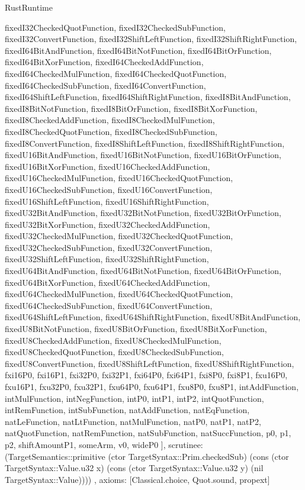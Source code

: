 \begin{lexlean}{RustRuntime}
\begin{semanticmodule}
{{      fixedI32CheckedQuotFunction,
      fixedI32CheckedSubFunction,
      fixedI32ConvertFunction,
      fixedI32ShiftLeftFunction,
      fixedI32ShiftRightFunction,
      fixedI64BitAndFunction,
      fixedI64BitNotFunction,
      fixedI64BitOrFunction,
      fixedI64BitXorFunction,
      fixedI64CheckedAddFunction,
      fixedI64CheckedMulFunction,
      fixedI64CheckedQuotFunction,
      fixedI64CheckedSubFunction,
      fixedI64ConvertFunction,
      fixedI64ShiftLeftFunction,
      fixedI64ShiftRightFunction,
      fixedI8BitAndFunction,
      fixedI8BitNotFunction,
      fixedI8BitOrFunction,
      fixedI8BitXorFunction,
      fixedI8CheckedAddFunction,
      fixedI8CheckedMulFunction,
      fixedI8CheckedQuotFunction,
      fixedI8CheckedSubFunction,
      fixedI8ConvertFunction,
      fixedI8ShiftLeftFunction,
      fixedI8ShiftRightFunction,
      fixedU16BitAndFunction,
      fixedU16BitNotFunction,
      fixedU16BitOrFunction,
      fixedU16BitXorFunction,
      fixedU16CheckedAddFunction,
      fixedU16CheckedMulFunction,
      fixedU16CheckedQuotFunction,
      fixedU16CheckedSubFunction,
      fixedU16ConvertFunction,
      fixedU16ShiftLeftFunction,
      fixedU16ShiftRightFunction,
      fixedU32BitAndFunction,
      fixedU32BitNotFunction,
      fixedU32BitOrFunction,
      fixedU32BitXorFunction,
      fixedU32CheckedAddFunction,
      fixedU32CheckedMulFunction,
      fixedU32CheckedQuotFunction,
      fixedU32CheckedSubFunction,
      fixedU32ConvertFunction,
      fixedU32ShiftLeftFunction,
      fixedU32ShiftRightFunction,
      fixedU64BitAndFunction,
      fixedU64BitNotFunction,
      fixedU64BitOrFunction,
      fixedU64BitXorFunction,
      fixedU64CheckedAddFunction,
      fixedU64CheckedMulFunction,
      fixedU64CheckedQuotFunction,
      fixedU64CheckedSubFunction,
      fixedU64ConvertFunction,
      fixedU64ShiftLeftFunction,
      fixedU64ShiftRightFunction,
      fixedU8BitAndFunction,
      fixedU8BitNotFunction,
      fixedU8BitOrFunction,
      fixedU8BitXorFunction,
      fixedU8CheckedAddFunction,
      fixedU8CheckedMulFunction,
      fixedU8CheckedQuotFunction,
      fixedU8CheckedSubFunction,
      fixedU8ConvertFunction,
      fixedU8ShiftLeftFunction,
      fixedU8ShiftRightFunction,
      fxi16P0,
      fxi16P1,
      fxi32P0,
      fxi32P1,
      fxi64P0,
      fxi64P1,
      fxi8P0,
      fxi8P1,
      fxu16P0,
      fxu16P1,
      fxu32P0,
      fxu32P1,
      fxu64P0,
      fxu64P1,
      fxu8P0,
      fxu8P1,
      intAddFunction,
      intMulFunction,
      intNegFunction,
      intP0,
      intP1,
      intP2,
      intQuotFunction,
      intRemFunction,
      intSubFunction,
      natAddFunction,
      natEqFunction,
      natLeFunction,
      natLtFunction,
      natMulFunction,
      natP0,
      natP1,
      natP2,
      natQuotFunction,
      natRemFunction,
      natSubFunction,
      natSuccFunction,
      p0,
      p1,
      p2,
      shiftAmountP1,
      someArm,
      v0,
      wideP0
    ],
    scrutinee: (TargetSemantics::primitive (ctor TargetSyntax::Prim.checkedSub) (cons (ctor TargetSyntax::Value.u32 x) (cons (ctor TargetSyntax::Value.u32 y) (nil TargetSyntax::Value))))
  },
  axioms: [Classical.choice, Quot.sound, propext]
}


\end{semanticmodule}
\end{lexlean}
